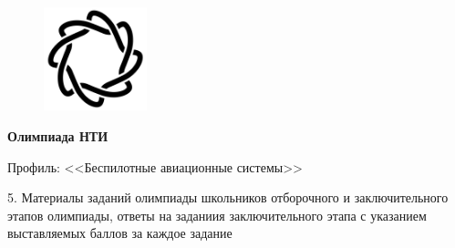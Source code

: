 \begin{titlepage}
        \begin{figure}
            \vspace{-80pt}
            \begin{center}
                \includegraphics[width=3cm]{tasks/NTI_logo_black}
            \end{center}
            \vspace{-20pt}
        \end{figure}
        
        \hspace{-90pt}\fontsize{28}{0}\textbf{Олимпиада НТИ}
        \vspace{1cm}

        \begin{center}
            \huge{Профиль: <<Беспилотные авиационные системы>>} \\
        \end{center}

        \noindent\large{5. Материалы заданий олимпиады школьников отборочного и заключительного этапов олимпиады, ответы на заданиия заключительного этапа с указанием выставляемых баллов за каждое задание}
\end{titlepage}